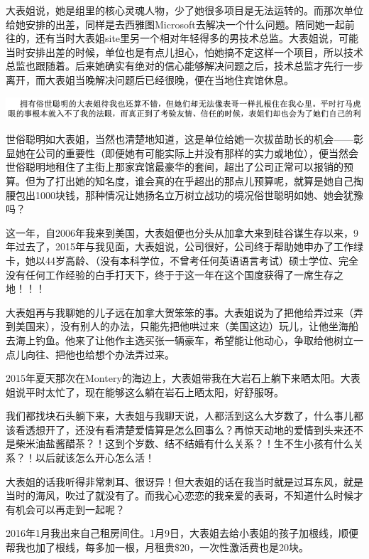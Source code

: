\documentclass[9pt, b5paper]{article}
\begin{document}
大表姐说，她是组里的核心灵魂人物，少了她很多项目是无法运转的。而那次单位给她安排的出差，同样是去西雅图Microsoft去解决一个什么问题。陪同她一起前往的，还有当时大表姐site里另一个相对年轻得多的男技术总监。大表姐说，可能当时安排出差的时候，单位也是有点儿担心，怕她搞不定这样一个项目，所以技术总监也跟随着。后来她确实有绝对的信心能够解决问题之后，技术总监才先行一步离开，而大表姐当晚解决问题后已经很晚，便在当地住宾馆休息。

\begin{center}
\includegraphics[width=.9\linewidth]{./pic/backups_plans_20210427_184530.png}
\end{center}

世俗聪明如大表姐，当然也清楚地知道，这是单位给她一次拔苗助长的机会——彰显她在公司的重要性（即便她有可能实际上并没有那样的实力或地位），便当然会世俗聪明地租住了主街上那家宾馆最豪华的套间，超出了公司正常可以报销的预算。但为了打出她的知名度，谁会真的在乎超出的那点儿预算呢，就算是她自己掏腰包出1000块钱，那种情况让她扬名立万树立战功的境况俗世聪明如她、她会犹豫吗？

这一年，自2006年我来到美国，大表姐便也分头从加拿大来到硅谷谋生存以来，9年过去了，2015年与我见面，大表姐说，公司很好，公司终于帮助她申办了工作绿卡，她以44岁高龄、（没有本科学位，不曾考任何英语语言考试）硕士学位、完全没有任何工作经验的白手打天下，终于于这一年在这个国度获得了一席生存之地！！！

大表姐再与我聊她的儿子远在加拿大贺笨笨的事。大表姐说为了把他给弄过来（弄到美国来），没有别人的办法，只能先把他哄过来（美国这边）玩儿，让他坐海船去海上钓鱼。他来了让他作主选买张一辆豪车，希望能让他动心，争取给他树立一点儿向往、把他也给想个办法弄过来。 

2015年夏天那次在Montery的海边上，大表姐带我在大岩石上躺下来晒太阳。大表姐说平时太忙了，现在能够这么躺在岩石上晒太阳，好舒服呀。

我们都找块石头躺下来，大表姐与我聊天说，人都活到这么大岁数了，什么事儿都该看透想开了，还没有看清楚爱情算是怎么回事么？再惊天动地的爱情到头来还不是柴米油盐酱醋茶？！这到个岁数、结不结婚有什么关系？！生不生小孩有什么关系？！以后就该怎么开心怎么活！

大表姐的话我听得非常刺耳、很讶异！但大表姐的话在我当时就是过耳东风，就是当时的海风，吹过了就没有了。而我心心恋恋的我亲爱的表哥，不知道什么时候才有机会可以再走到一起呢？

2016年1月我出来自己租房间住。1月9日，大表姐去给小表姐的孩子加根线，顺便帮我也加了根线，每多加一根，月租贵\$20，一次性激活费也是20块。 
\end{document}
